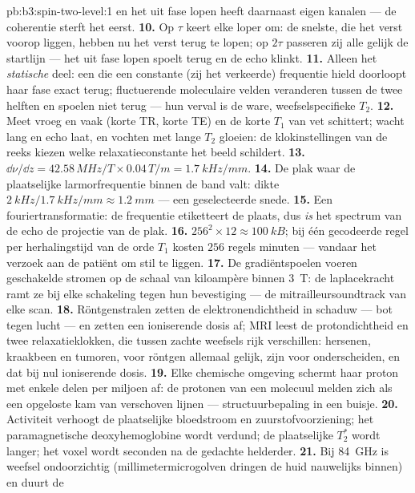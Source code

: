 \begin{solution}{pb:b3:spin-two-level:1}
en het uit fase lopen heeft daarnaast eigen kanalen --- de coherentie
sterft het eerst.
\textbf{10.} Op $\tau$ keert elke loper om: de snelste, die het verst
voorop liggen, hebben nu het verst terug te lopen; op $2\tau$ passeren
zij alle gelijk de startlijn --- het uit fase lopen spoelt terug en de
echo klinkt.
\textbf{11.} Alleen het \emph{statische} deel: een  die een
constante (zij het verkeerde) frequentie hield doorloopt haar fase exact
terug; fluctuerende moleculaire velden veranderen tussen de twee helften
en spoelen niet terug --- hun verval is de ware, weefselspecifieke $T_2$.
\textbf{12.} Meet vroeg en vaak (korte TR, korte TE) en de korte $T_1$
van vet schittert; wacht lang en echo laat, en vochten met lange $T_2$
gloeien: de klokinstellingen van de reeks kiezen welke relaxatieconstante
het beeld schildert.
\textbf{13.} $\dd\nu/\dd z = 42.58\,\unit{MHz/T} \times
0.04\,\unit{T/m} = \qty{1.7}{kHz/mm}$.
\textbf{14.} De plak waar de plaatselijke larmorfrequentie binnen de band
valt: dikte $\qty{2}{kHz}/\qty{1.7}{kHz/mm} \approx
\qty{1.2}{mm}$ ---
een geselecteerde snede.
\textbf{15.} Een fouriertransformatie: de frequentie etiketteert de
plaats, dus \emph{is} het spectrum van de echo de projectie van de plak.
\textbf{16.} $256^2 \times 12 \approx \qty{100}{kB}$; bij één gecodeerde
regel per herhalingstijd van de orde $T_1$ kosten $256$ regels minuten
--- vandaar het verzoek aan de patiënt om stil te liggen.
\textbf{17.} De gradiëntspoelen voeren geschakelde stromen op de schaal
van kiloampère binnen \qty{3}{T}: de laplacekracht ramt ze bij elke
schakeling tegen hun bevestiging --- de mitrailleursoundtrack van elke
scan.
\textbf{18.} Röntgenstralen zetten de elektronendichtheid in schaduw ---
bot tegen lucht --- en zetten een ioniserende dosis af; MRI leest de
protondichtheid en twee relaxatieklokken, die tussen zachte weefsels
rijk verschillen: hersenen, kraakbeen en tumoren, voor röntgen allemaal
gelijk, zijn voor  onderscheiden, en dat bij nul ioniserende dosis.
\textbf{19.} Elke chemische omgeving schermt haar proton met enkele delen
per miljoen af: de protonen van een molecuul melden zich als een
opgeloste kam van verschoven lijnen --- structuurbepaling in een buisje.
\textbf{20.} Activiteit verhoogt de plaatselijke bloedstroom en
zuurstofvoorziening; het paramagnetische deoxyhemoglobine wordt verdund;
de plaatselijke $T_2^*$ wordt langer; het voxel wordt seconden na de
gedachte helderder.
\textbf{21.} Bij \qty{84}{GHz} is weefsel ondoorzichtig
(millimetermicrogolven dringen de huid nauwelijks binnen) en duurt de

\end{solution}
